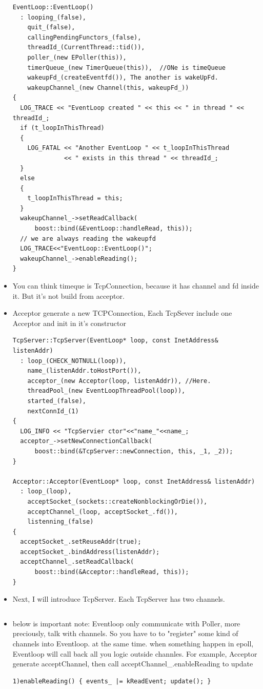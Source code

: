 \documentclass[paper=8.5in:11in, twoside, 12pt, pagesize=pdftex]{book}
\begin{document}
\begin{itemize}
\begin{lstlisting}[]
EventLoop::EventLoop()
  : looping_(false),
    quit_(false),
    callingPendingFunctors_(false),
    threadId_(CurrentThread::tid()),
    poller_(new EPoller(this)),
    timerQueue_(new TimerQueue(this)),  //ONe is timeQueue
    wakeupFd_(createEventfd()), The another is wakeUpFd.
    wakeupChannel_(new Channel(this, wakeupFd_))
{
  LOG_TRACE << "EventLoop created " << this << " in thread " << threadId_;
  if (t_loopInThisThread)
  {
    LOG_FATAL << "Another EventLoop " << t_loopInThisThread
              << " exists in this thread " << threadId_;
  }
  else
  {
    t_loopInThisThread = this;
  }
  wakeupChannel_->setReadCallback(
      boost::bind(&EventLoop::handleRead, this));
  // we are always reading the wakeupfd
  LOG_TRACE<<"EventLoop::EventLoop()";
  wakeupChannel_->enableReading();
}
\end{lstlisting}

\item You can think timeque is TcpConnection, because it has channel and fd inside it.  But it's not build from acceptor. 

\item Acceptor generate a new TCPConnection, Each TcpSever include one Acceptor and init in it's constructor
\begin{lstlisting}[]
TcpServer::TcpServer(EventLoop* loop, const InetAddress& listenAddr)
  : loop_(CHECK_NOTNULL(loop)),
    name_(listenAddr.toHostPort()),
    acceptor_(new Acceptor(loop, listenAddr)), //Here. 
    threadPool_(new EventLoopThreadPool(loop)),
    started_(false),
    nextConnId_(1)
{
  LOG_INFO << "TcpServier ctor"<<"name_"<<name_;
  acceptor_->setNewConnectionCallback(
      boost::bind(&TcpServer::newConnection, this, _1, _2));
}

Acceptor::Acceptor(EventLoop* loop, const InetAddress& listenAddr)
  : loop_(loop),
    acceptSocket_(sockets::createNonblockingOrDie()),
    acceptChannel_(loop, acceptSocket_.fd()),
    listenning_(false)
{
  acceptSocket_.setReuseAddr(true);
  acceptSocket_.bindAddress(listenAddr);
  acceptChannel_.setReadCallback(
      boost::bind(&Acceptor::handleRead, this));
}
\end{lstlisting}

\item Next, I will introduce TcpServer. Each TcpServer has two channels. 
\begin{lstlisting}[]

\end{lstlisting}
\item below is important note: Eventloop only communicate with Poller, more preciously, talk with channels. So you have to to "register" some kind of channels into Eventloop. at the same time. when something happen in epoll, Eventloop will call back all you logic outside channles.  For example,  Acceptor generate acceptChannel, then call acceptChannel\_.enableReading to update 
\begin{lstlisting}[]
1)enableReading() { events_ |= kReadEvent; update(); }


\end{lstlisting}
\end{itemize}
\end{document}
